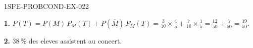 \begin{corrige}{1SPE-PROBCOND-EX-022}

\textbf{1.} $P(T) = P(M)\,P_M(T) + P(\overline{M})\,P_{\overline{M}}(T) = \frac{3}{10}\times\frac{4}{5} + \frac{7}{10}\times\frac{1}{5} = \frac{12}{50}+\frac{7}{50} = \frac{19}{50}$.

\textbf{2.} $38\,\%$ des eleves assistent au concert.

\end{corrige}

